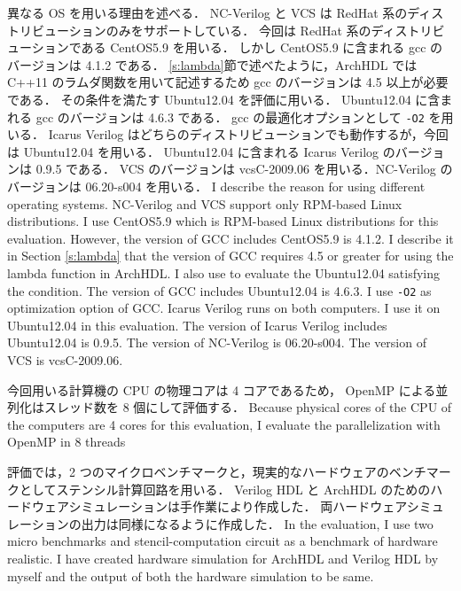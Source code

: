 異なる OS を用いる理由を述べる．
NC-Verilog と VCS は RedHat 系のディストリビューションのみをサポートしている．
今回は RedHat 系のディストリビューションである CentOS5.9 を用いる．
しかし CentOS5.9 に含まれる gcc のバージョンは 4.1.2 である．
\ref{s:lambda}節で述べたように，ArchHDL では C++11 のラムダ関数を用いて記述するため gcc のバージョンは 4.5 以上が必要である．
その条件を満たす Ubuntu12.04 を評価に用いる．
Ubuntu12.04 に含まれる gcc のバージョンは 4.6.3 である．
gcc の最適化オプションとして \verb/-O2/ を用いる．
Icarus Verilog はどちらのディストリビューションでも動作するが，今回は Ubuntu12.04 を用いる．
Ubuntu12.04 に含まれる Icarus Verilog のバージョンは 0.9.5 である．
VCS のバージョンは vcsC-2009.06 を用いる．NC-Verilog のバージョンは 06.20-s004 を用いる．
\fi
I describe the reason for using different operating systems.
NC-Verilog and VCS support only RPM-based Linux distributions.
I use CentOS5.9 which is RPM-based Linux distributions for this evaluation.
However, the version of GCC includes CentOS5.9 is 4.1.2.
I describe it in Section \ref{s:lambda} that the version of GCC requires 4.5 or greater for using the lambda function in ArchHDL.
I also use to evaluate the Ubuntu12.04 satisfying the condition.
The version of GCC includes Ubuntu12.04 is 4.6.3.
I use \verb/-O2/ as optimization option of GCC.
Icarus Verilog runs on both computers.
I use it on Ubuntu12.04 in this evaluation.
The version of Icarus Verilog includes Ubuntu12.04 is 0.9.5.
The version of NC-Verilog is 06.20-s004.
The version of VCS is vcsC-2009.06.

今回用いる計算機の CPU の物理コアは 4 コアであるため， OpenMP による並列化はスレッド数を 8 個にして評価する．
\fi
Because physical cores of the CPU of the computers are 4 cores for this evaluation,
I evaluate the parallelization with OpenMP in 8 threads

評価では，2 つのマイクロベンチマークと，現実的なハードウェアのベンチマークとしてステンシル計算回路\cite{koba:stencil}を用いる．
Verilog HDL と ArchHDL のためのハードウェアシミュレーションは手作業により作成した．
両ハードウェアシミュレーションの出力は同様になるように作成した．
\fi
In the evaluation, I use two micro benchmarks
and stencil-computation circuit as a benchmark of hardware realistic.
I have created hardware simulation for ArchHDL and Verilog HDL by myself
and the output of both the hardware simulation to be same.

